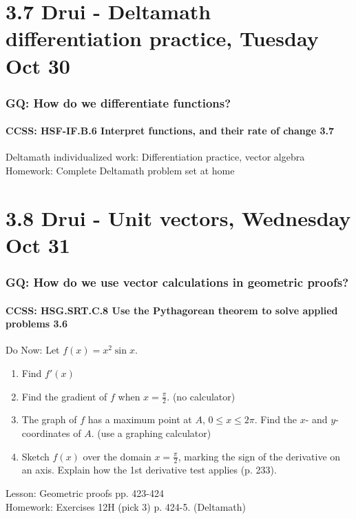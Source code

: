 \documentclass{beamer}
\begin{document}
\section{3.7 Drui - Deltamath differentiation practice, Tuesday Oct 30}
  \frame
  {
    \frametitle{GQ: How do we differentiate functions?}
    \framesubtitle{CCSS: HSF-IF.B.6 Interpret functions, and their rate of change  \alert{3.7}}


    Deltamath individualized work: Differentiation practice, vector algebra \\ \bigskip
    Homework: Complete Deltamath problem set at home
  }

\section{3.8 Drui - Unit vectors, Wednesday Oct 31}
  \frame
  {
    \frametitle{GQ: How do we use vector calculations in geometric proofs?}
    \framesubtitle{CCSS: HSG.SRT.C.8 Use the Pythagorean theorem to solve applied problems \qquad \alert{3.6}}

    \begin{block}{Do Now: Let $f(x)=x^2 \sin x$.}
    \begin{enumerate}
        \item Find $f'(x)$
        \item Find the gradient of $f$ when $x= \frac{\pi}{2}$. (no calculator)
        \item The graph of $f$ has a maximum point at $A$, $0 \leq x \leq 2\pi$. Find the $x$- and $y$-coordinates of $A$. (use a graphing calculator)
        \item Sketch $f(x)$ over the domain $x= \frac{\pi}{2}$, marking the sign of the derivative on an axis. Explain how the 1st derivative test applies (p. 233).
    \end{enumerate}
    \end{block}
    Lesson: Geometric proofs pp. 423-424\\ \bigskip
    Homework: Exercises 12H (pick 3) p. 424-5. (Deltamath)
  }
\end{document}
